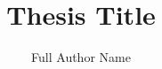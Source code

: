 

\phd %

%
\title{\bf Thesis Title}
\author{Full Author Name}


\abstract{}

\copyrightpage       %

\acknowledgements{}
\dedication{}


\beforepreface

\figurespage
\tablespage

\afterpreface
